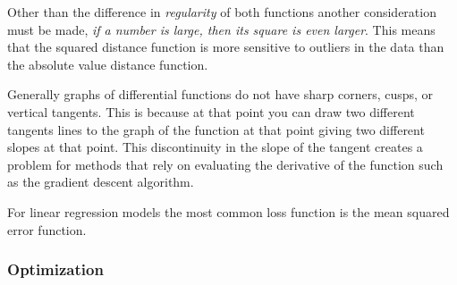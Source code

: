 \documentclass[12pt letter]{report}
\begin{document}
Other than the difference in \textit{regularity} of both functions another consideration must be made, \textit{if a
  number is large, then its square is even larger}. This means that the squared distance function is more sensitive to
outliers in the data than the absolute value distance function.


Generally graphs of differential functions do not have sharp corners, cusps, or vertical tangents. This is because at
that point you can draw two different tangents lines to the graph of the function at that point giving two different
slopes at that point. This discontinuity in the slope of the tangent creates a problem for methods that rely on
evaluating the derivative of the function such as the gradient descent algorithm.

For linear regression models the most common loss function is the mean squared error function.


\subsubsection{Optimization}
\end{document}
